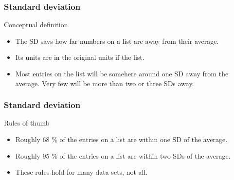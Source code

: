 \documentclass[handout]{beamer}
\begin{document}
   \begin{frame} \frametitle{Standard deviation}

   \begin{block}
   {Conceptual definition}

   \begin{itemize}
   \item    The SD says how far numbers on a list are away from their
   average.
   \item Its units are in the original units if the list.

   \item Most entries on the list will be somehere around one SD
   away from the average. Very few will be more than two or three SDs away.
   \end{itemize}

   \end{block}
   \end{frame}


   \begin{frame} \frametitle{Standard deviation}

   \begin{block}
   {Rules of thumb}

   \begin{itemize}
   \item  Roughly 68 \% of the entries on a list are within one SD of the average.
   \item  Roughly 95 \% of the entries on a list are within two SDs of the average.
   \item These rules hold for many data sets, not all.
   \end{itemize}
   \end{block}
   \end{frame}

\end{document}
